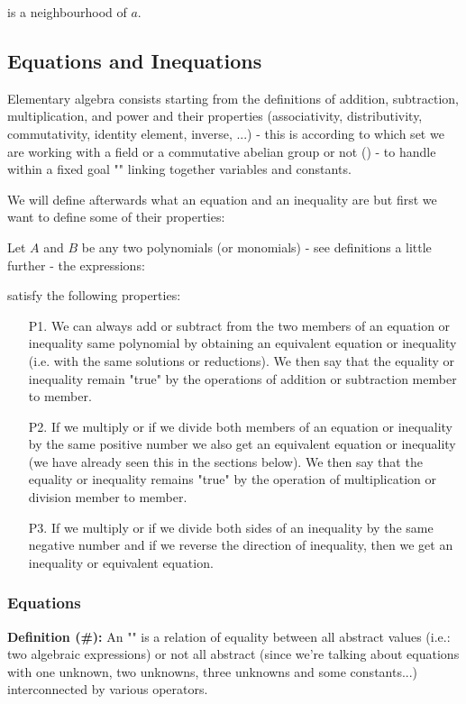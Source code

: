 is a neighbourhood of $a$.

\subsection{Equations and Inequations}

Elementary algebra consists starting from the definitions of addition, subtraction, multiplication, and power and their properties (associativity, distributivity, commutativity, identity element, inverse, ...) - this is according to which set we are working with a field or a commutative abelian group or not () - to handle within a fixed goal "" linking together variables and constants.

We will define afterwards what an equation and an inequality are but first we want to define some of their properties:

Let $A$ and $B$ be any two polynomials (or monomials)  - see definitions a little further - the expressions:
	
satisfy the following properties:
	\begin{enumerate}
		\item[P1.] We can always add or subtract from the two members of an equation or inequality same polynomial by obtaining an equivalent equation or inequality (i.e. with the same solutions or reductions). We then say that the equality or inequality remain "true" by the operations of addition or subtraction member to member.
		\item[P2.] If we multiply or if we divide both members of an equation or inequality by the same positive number we also get an equivalent equation or inequality (we have already seen this in the sections below). We then say that the equality or inequality remains "true" by the operation of multiplication or division member to member.
		\item[P3.] If we multiply or if we divide both sides of an inequality by the same negative number and if we reverse the direction of inequality, then we get an inequality or equivalent equation.
	\end{enumerate}
	
	\subsubsection{Equations}
	\textbf{Definition (\#\mydef):} An "" is a relation of equality between all abstract values (i.e.: two algebraic expressions) or not all abstract (since we're talking about equations with one unknown, two unknowns, three unknowns and some constants...) interconnected by various operators.

